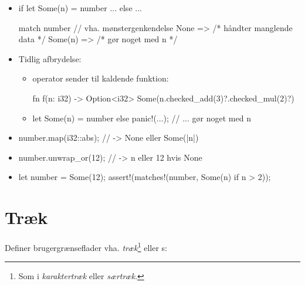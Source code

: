 \documentclass{article}
\begin{document}
\begin{itemize}

\item
\begin{rustcode}
if let Some(n) = number {...} else {...}
\end{rustcode}

\begin{rustcode}
match number { // vha. mønstergenkendelse
    None => { /* håndter manglende data */ }
    Some(n) => { /* gør noget med n */ }
}
\end{rustcode}

\item Tidlig afbrydelse:
\begin{itemize}
\item {} operator sender  til
kaldende funktion:
\begin{rustcode}
fn f(n: i32) -> Option<i32> {
    Some(n.checked_add(3)?.checked_mul(2)?)
}
\end{rustcode}

\item
\begin{rustcode}
let Some(n) = number else { panic!(...); }
// ... gør noget med n
\end{rustcode}
\end{itemize}

\item
\begin{rustcode}
number.map(i32::abs); // -> None eller Some(|n|)
\end{rustcode}

\item
\begin{rustcode}
number.unwrap_or(12); // -> n eller 12 hvis None    
\end{rustcode}

\item
\begin{rustcode}
let number = Some(12);
assert!(matches!(number, Some(n) if n > 2));
\end{rustcode}

\end{itemize}


\newpage
\section*{Træk}
Definer brugergrænseflader vha. \emph{træk}\footnote{Som i \emph{karaktertræk} eller \emph{særtræk}.} eller s:
\end{document}
